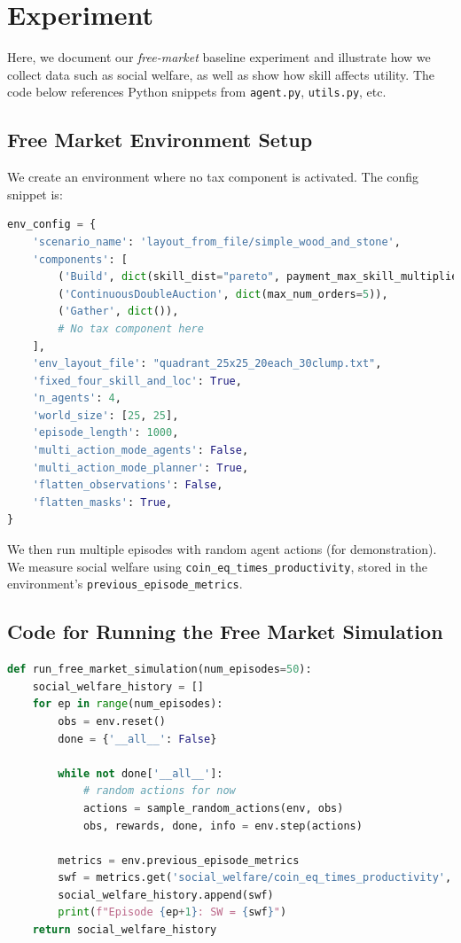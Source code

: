 \section{Experiment}
\label{sec:experiment}

Here, we document our \emph{free-market} baseline experiment and illustrate how we collect data such as social welfare, as well as show how skill affects utility. The code below references Python snippets from \texttt{agent.py}, \texttt{utils.py}, etc.

\subsection{Free Market Environment Setup}

We create an environment where no tax component is activated. The config snippet is:

\begin{lstlisting}[language=Python]
env_config = {
    'scenario_name': 'layout_from_file/simple_wood_and_stone',
    'components': [
        ('Build', dict(skill_dist="pareto", payment_max_skill_multiplier=3)),
        ('ContinuousDoubleAuction', dict(max_num_orders=5)),
        ('Gather', dict()),
        # No tax component here
    ],
    'env_layout_file': "quadrant_25x25_20each_30clump.txt",
    'fixed_four_skill_and_loc': True,
    'n_agents': 4,
    'world_size': [25, 25],
    'episode_length': 1000,
    'multi_action_mode_agents': False,
    'multi_action_mode_planner': True,
    'flatten_observations': False,
    'flatten_masks': True,
}
\end{lstlisting}

We then run multiple episodes with random agent actions (for demonstration). We measure social welfare using \texttt{coin\_eq\_times\_productivity}, stored in the environment’s \texttt{previous\_episode\_metrics}.

\subsection{Code for Running the Free Market Simulation}

\begin{lstlisting}[language=Python]
def run_free_market_simulation(num_episodes=50):
    social_welfare_history = []
    for ep in range(num_episodes):
        obs = env.reset()
        done = {'__all__': False}
        
        while not done['__all__']:
            # random actions for now
            actions = sample_random_actions(env, obs)
            obs, rewards, done, info = env.step(actions)
        
        metrics = env.previous_episode_metrics
        swf = metrics.get('social_welfare/coin_eq_times_productivity', np.nan)
        social_welfare_history.append(swf)
        print(f"Episode {ep+1}: SW = {swf}")
    return social_welfare_history
\end{lstlisting}

